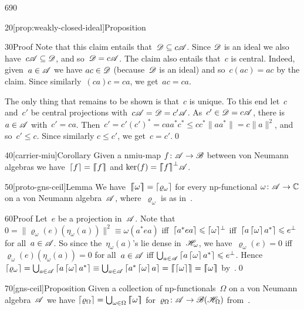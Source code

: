 \begin{parsec}{690}
\begin{point}{20}[prop:weakly-closed-ideal]{Proposition}
\begin{point}{30}{Proof}
Note that this claim entails that~$\mathscr{D} \subseteq c\mathscr{A}$.
Since $\mathscr{D}$ is an ideal
we also have~$c\mathscr{A}\subseteq \mathscr{D}$,
and so~$\mathscr{D}= c\mathscr{A}$.
The claim also entails that~$c$ is central.
Indeed,
given~$a\in\mathscr{A}$
we have $ac\in \mathscr{D}$ 
(because~$\mathscr{D}$ is an ideal)
and so~$c(ac)=ac$ by the claim.
Since similarly~$(ca)c=ca$,
we get~$ac=ca$.

The only thing that remains to be shown is that~$c$
is unique.
To this end let~$c$ and~$c'$ be central projections 
with~$c\mathscr{A} = \mathscr{D}=c'\mathscr{A}$.
As~$c'\in\mathscr{D}=c \mathscr{A}$,
there is~$a\in \mathscr{A}$
with~$c' = ca$.
Then~$c' = c'(c')^* = caa^*c^*\leq 
cc^*\|aa^*\|=c\|a\|^2$,
and so~$c'\leq c$.
Since similarly $c\leq c'$, we get~$c=c'$.\qed
\end{point}
\end{point}
\begin{point}{40}[carrier-miu]{Corollary}%
Given a nmiu-map $f\colon \mathscr{A}\to\mathscr{B}$
between von Neumann algebras
we have~$\left\lceil f\right\rceil=\left\lceil\!\!\left\lceil f\right\rceil\!\!\right\rceil$
and $\ker(f)=\left\lceil\!\!\left\lceil f\right\rceil\!\!\right\rceil^\perp\!\mathscr{A}$.
\end{point}
\begin{point}{50}[proto-gns-ceil]{Lemma}%
We have~$\left\lceil\!\!\left\lceil\omega\right\rceil\!\!\right\rceil=
\left\lceil\varrho_\omega\right\rceil$
for every np-functional $\omega\colon \mathscr{A}\to\mathbb{C}$
on a von Neumann algebra~$\mathscr{A}$,
where~$\varrho_\omega$
is as in~.
\begin{point}{60}{Proof}%
Let~$e$ be a projection in~$\mathscr{A}$.
Note that $0=\|\varrho_\omega(e)(\eta_\omega(a))\|^2
\equiv \omega(a^*ea)$
iff~$\left\lceil a^*ea\right\rceil\leqslant \smash{\left\lceil\omega\right\rceil}^\perp$
iff~$\left\lceil a\left\lceil\omega\right\rceil a^*\right\rceil\leqslant e^\perp$
for all~$a\in\mathscr{A}$.
So since the~$\eta_\omega(a)$'s lie dense in~$\mathscr{H}_\omega$,
we have~$\varrho_\omega(e)=0$
iff $\varrho_\omega(e)(\eta_\omega(a))=0$ for all~$a\in\mathscr{A}$
iff $\bigcup_{a\in\mathscr{A}} \left\lceil a\left\lceil\omega\right\rceil a^*\right\rceil\leqslant e^\perp$.
Hence $\ceil{\varrho_\omega}=
\bigcup_{a\in\scrA}
\ceil{a\ceil{\omega}a^*} \equiv
\bigcup_{a\in\scrA}
\ceil{a^*\ceil{\omega}a}
=\cceil{\ceil{\omega}}
=\cceil{\omega}$
by~.\qed
\end{point}
\end{point}
\begin{point}{70}[gns-ceil]{Proposition}%
Given a collection of np-functionals~$\Omega$
on a von Neumann algebra~$\mathscr{A}$
we have $\left\lceil\varrho_\Omega\right\rceil
=\bigcup_{\omega\in\Omega} \left\lceil\!\!\left\lceil\omega\right\rceil\!\!\right\rceil$
for~$\varrho_\Omega\colon \mathscr{A}\to\mathscr{B}(\mathscr{H}_\Omega)$
from~.
\end{point}
\end{parsec}
